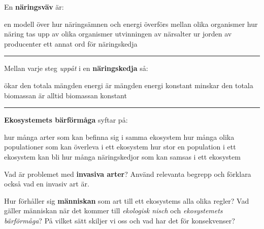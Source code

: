 \documentclass{exam}
\begin{document}
\begin{questions}
\question En \textbf{näringsväv} är:
\begin{checkboxes}
   \choice en modell över hur näringsämnen och energi överförs mellan olika organismer
   \choice hur näring tas upp av olika organismer
   \choice utvinningen av närsalter ur jorden av producenter
   \choice ett annat ord för näringskedja
\end{checkboxes}

\vspace{5mm} 
\hrule 
\vspace{5mm} 
\question Mellan varje steg \textit{uppåt} i en \textbf{näringskedja} så:
\begin{checkboxes}
   \choice ökar den totala mängden energi
   \choice är mängden energi konstant
   \choice minskar den totala biomassan
   \choice är alltid biomassan konstant
\end{checkboxes}

\vspace{5mm} 
\hrule 
\vspace{5mm} 
\question \textbf{Ekosystemets bärförmåga} syftar på:
\begin{checkboxes}
   \choice hur många arter som kan befinna sig i samma ekosystem
   \choice hur många olika populationer som kan överleva i ett ekosystem
   \choice hur stor en population i ett ekosystem kan bli
   \choice hur många näringskedjor som kan samsas i ett ekosystem
\end{checkboxes}
\break
\vspace{5mm} %
\begin{center}
\end{center}
\vspace{5mm} %

\question 
Vad är problemet med \textbf{invasiva arter}? Använd relevanta begrepp och förklara också vad en invasiv art är.

\vspace{80mm} %

\question
Hur förhåller sig \textbf{människan} som art till ett ekosystems alla olika regler? Vad gäller människan när det kommer till \textit{ekologisk nisch} och \textit{ekosystemets bärförmåga}? På vilket sätt skiljer vi oss och vad har det för konsekvenser?

\end{questions}
\end{document}
